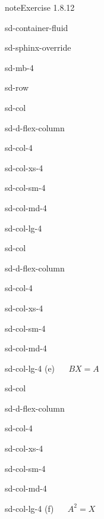 \documentclass[letterpaper,10pt,english]{jupyterBook}
\begin{document}
\begin{sphinxadmonition}{note}{Exercise 1.8.12}
\begin{sphinxuseclass}{sd-container-fluid}
\begin{sphinxuseclass}{sd-sphinx-override}
\begin{sphinxuseclass}{sd-mb-4}
\begin{sphinxuseclass}{sd-row}
\begin{sphinxuseclass}{sd-col}
\begin{sphinxuseclass}{sd-d-flex-column}
\begin{sphinxuseclass}{sd-col-4}
\begin{sphinxuseclass}{sd-col-xs-4}
\begin{sphinxuseclass}{sd-col-sm-4}
\begin{sphinxuseclass}{sd-col-md-4}
\begin{sphinxuseclass}{sd-col-lg-4}
\end{sphinxuseclass}
\end{sphinxuseclass}
\end{sphinxuseclass}
\end{sphinxuseclass}
\end{sphinxuseclass}
\end{sphinxuseclass}
\end{sphinxuseclass}
\begin{sphinxuseclass}{sd-col}
\begin{sphinxuseclass}{sd-d-flex-column}
\begin{sphinxuseclass}{sd-col-4}
\begin{sphinxuseclass}{sd-col-xs-4}
\begin{sphinxuseclass}{sd-col-sm-4}
\begin{sphinxuseclass}{sd-col-md-4}
\begin{sphinxuseclass}{sd-col-lg-4}
\sphinxAtStartPar
(e)   \(BX = A\)

\end{sphinxuseclass}
\end{sphinxuseclass}
\end{sphinxuseclass}
\end{sphinxuseclass}
\end{sphinxuseclass}
\end{sphinxuseclass}
\end{sphinxuseclass}
\begin{sphinxuseclass}{sd-col}
\begin{sphinxuseclass}{sd-d-flex-column}
\begin{sphinxuseclass}{sd-col-4}
\begin{sphinxuseclass}{sd-col-xs-4}
\begin{sphinxuseclass}{sd-col-sm-4}
\begin{sphinxuseclass}{sd-col-md-4}
\begin{sphinxuseclass}{sd-col-lg-4}
\sphinxAtStartPar
(f)   \(A^2 = X\)


\end{sphinxuseclass}
\end{sphinxuseclass}
\end{sphinxuseclass}
\end{sphinxuseclass}
\end{sphinxuseclass}
\end{sphinxuseclass}
\end{sphinxuseclass}
\end{sphinxuseclass}
\end{sphinxuseclass}
\end{sphinxuseclass}
\end{sphinxuseclass}
\end{sphinxadmonition}
\end{document}
